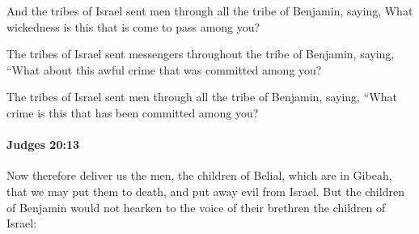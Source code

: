 			\begin{versebox}
					\item[BHS] 
					\item[ASV] And the tribes of Israel sent men through all the tribe of Benjamin, saying, What wickedness is this that is come to pass among you?
					\item[NIV] The tribes of Israel sent messengers throughout the tribe of Benjamin, saying, “What about this awful crime that was committed among you?
					\item[NRSV] The tribes of Israel sent men through all the tribe of Benjamin, saying, “What crime is this that has been committed among you?
			\end{versebox}

		\paragraph{Judges 20:13} %
			\label{JUDGES-20-13}

			Now therefore deliver us the men, the children of Belial, which are in Gibeah, that we may put them to death, and put away evil from Israel. But the children of Benjamin would not hearken to the voice of their brethren the children of Israel:

